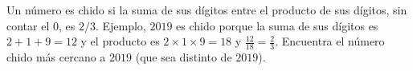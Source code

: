 Un número es chido si la suma de sus dígitos entre el producto de sus dígitos, sin contar el $0$, es $2/3$. Ejemplo, $2019$ es chido porque la suma de sus dígitos es $2+1+9 = 12$ y el producto es $2\times 1\times 9 = 18$ y $\frac{12}{18} = \frac 23$. Encuentra el número chido más cercano a $2019$ (que sea distinto de $2019$).